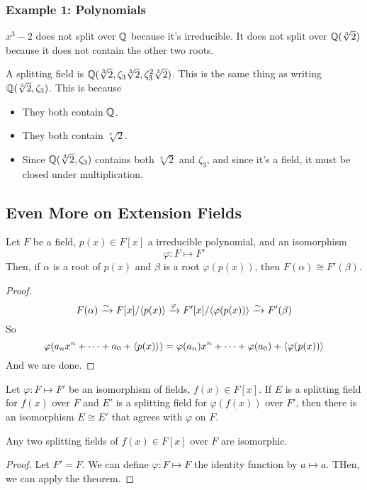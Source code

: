 \documentclass[letterpaper]{article}
\begin{document}
\subsubsection{Example 1: Polynomials}
$x^3 - 2$ does not split over $\mathbb{Q}$ because it's irreducible. It does not split over $\mathbb{Q}(\sqrt[3]{2})$ because it does not contain the other two roots. 

\bigskip 

A splitting field is $\mathbb{Q}(\sqrt[3]{2}, \zeta_3 \sqrt[3]{2}, \zeta_{3}^2 \sqrt[3]{2})$. This is the same thing as writing $\mathbb{Q}(\sqrt[3]{2}, \zeta_3)$. This is because 
\begin{itemize}
    \item They both contain $\mathbb{Q}$. 
    \item They both contain $\sqrt[3]{2}$. 
    \item Since $\mathbb{Q}(\sqrt[3]{2}, \zeta_3)$ contains both $\sqrt[3]{2}$ and $\zeta_3$, and since it's a field, it must be closed under multiplication.
\end{itemize}

\subsection{Even More on Extension Fields}
\begin{theorem}{}{}
    Let $F$ be a field, $p(x) \in F[x]$ a irreducible polynomial, and an isomorphism 
    \[\varphi: F \mapsto F'\]
    Then, if $\alpha$ is a root of $p(x)$ and $\beta$ is a root $\varphi(p(x))$, then $F(\alpha) \cong F'(\beta)$. 
\end{theorem}

\begin{mdframed}[]
    \begin{proof}
        \[F(\alpha) \xrightarrow{\sim{}} F[x] / \langle p(x) \rangle \xrightarrow{\varphi} F'[x] / \langle \varphi(p(x)) \rangle \xrightarrow{\sim{}} F'(\beta)\]
        So 
        \[\varphi(a_n x^n + \dots + a_0 + \langle p(x) \rangle) = \varphi(a_n) x^n + \dots + \varphi(a_0) + \langle \varphi(p(x)) \rangle\]
        And we are done. 
    \end{proof}
\end{mdframed}

\begin{theorem}{}{}
    Let $\varphi: F \mapsto F'$ be an isomorphism of fields, $f(x) \in F[x]$. If $E$ is a splitting field for $f(x)$ over $F$ and $E'$ is a splitting field for $\varphi(f(x))$ over $F'$, then there is an isomorphism $E \cong E'$ that agrees with $\varphi$ on $F$. 
\end{theorem}

\begin{corollary}{}{}
    Any two splitting fields of $f(x) \in F[x]$ over $F$ are isomorphic. 
\end{corollary}

\begin{mdframed}[]
    \begin{proof}
        Let $F' = F$. We can define $\varphi: F \mapsto F$ the identity function by $a \mapsto a$. THen, we can apply the theorem.
    \end{proof}
\end{mdframed}
\end{document}

